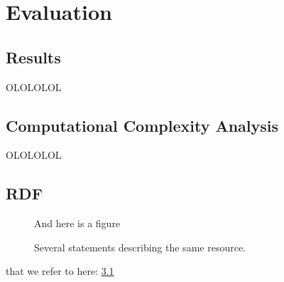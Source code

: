 \documentclass[a4paper,11pt]{kth-mag}
\begin{document}
\part{Evaluation}

\chapter{Results}
OLOLOLOL

\chapter{Computational Complexity Analysis}
OLOLOLOL





\appendix
\addappheadtotoc
\chapter{RDF}\label{appA}

\begin{figure}[ht]
\begin{center}
And here is a figure
\caption{\small{Several statements describing the same resource.}}\label{RDF_4}
\end{center}
\end{figure}

that we refer to here: \ref{RDF_4}
\end{document}
